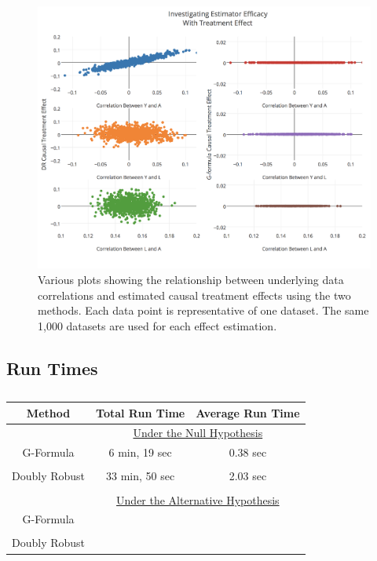 \begin{figure}[h!]
\includegraphics[width = \linewidth]{figures/correlation2.png}
\caption[Scatterplots of relationships between estimates and data correlations under the alternative hypothesis]{Various plots showing the relationship between underlying data correlations and estimated causal treatment effects using the two methods.  Each data point is representative of one dataset.  The same 1,000 datasets are used for each effect estimation.}
\label{correlation2}
\end{figure}

\subsection{Run Times} 

\begin{table}[h!]
\centering
\begin{tabular}{c | c c }
Method & Total Run Time & Average Run Time\\
\hline 
& \multicolumn{2}{c}{\underline{Under the Null Hypothesis}} \\
G-Formula & 6 min, 19 sec & 0.38 sec \\ \\ 
Doubly Robust & 33 min, 50 sec & 2.03 sec\\ \\ 
& \multicolumn{2}{c}{\underline{Under the Alternative Hypothesis}} \\
G-Formula & & \\ \\ 
Doubly Robust & & 
\end{tabular} \\
\centering
\caption[Run Times of Simulations]{ \label{runtimes}}
\end{table}



